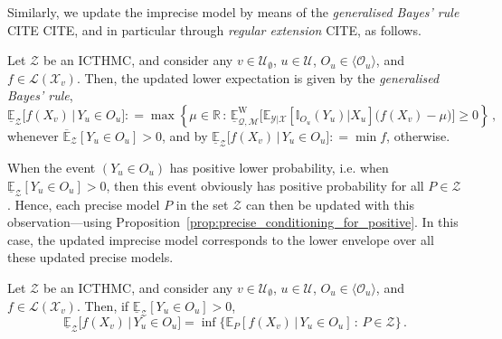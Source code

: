 \documentclass[twoside,11pt]{article}
\newcommand{\reals}{\mathbb{R}}
\newcommand{\states}{\mathcal{X}}
\newcommand{\observs}{\mathcal{Y}}
\newcommand{\lexp}{\underline{\mathbb{E}}_{\rateset,\mathcal{M}}^\mathrm{W}}
\newcommand{\gambles}{\mathcal{L}}
\newcommand{\ind}[1]{\mathbb{I}_{#1}}
\newcommand{\rateset}{\mathcal{Q}}
\newcommand{\coloneqq}{:\!=}
\begin{document}
Similarly, we update the imprecise model by means of the \emph{generalised Bayes' rule} CITE CITE, and in particular through \emph{regular extension} CITE, as follows.
\begin{definition}
Let $\mathcal{Z}$ be an ICTHMC, and consider any $v\in\mathcal{U}_\emptyset$, $u\in\mathcal{U}$, $O_u\in\langle\mathcal{O}_u\rangle$, and $f\in\gambles(\states_v)$. Then, the updated lower expectation is given by the \emph{generalised Bayes' rule},
\begin{equation*}
\underline{\mathbb{E}}_{\mathcal{Z}}\bigl[f(X_v)\,\vert\,Y_u\in O_u\bigr] \coloneqq \max\left\{\mu\in\reals\,:\, \lexp\bigl[\mathbb{E}_{\observs\vert\states}[\ind{O_u}(Y_u)\vert X_u]\bigl(f(X_v) - \mu\bigr)\bigr] \geq 0\right\}\,,
\end{equation*}
whenever $\overline{\mathbb{E}}_\mathcal{Z}[Y_u\in O_u] >0$, and by $\underline{\mathbb{E}}_{\mathcal{Z}}\bigl[f(X_v)\,\vert\,Y_u\in O_u\bigr]\coloneqq\min f$, otherwise.
\end{definition}

When the event $(Y_u\in O_u)$ has positive lower probability, i.e. when $\underline{\mathbb{E}}_\mathcal{Z}[Y_u\in O_u] > 0$, then this event obviously has positive probability for all $P\in\mathcal{Z}$. Hence, each precise model $P$ in the set $\mathcal{Z}$ can then be updated with this observation---using Proposition~\ref{prop:precise_conditioning_for_positive}. In this case, the updated imprecise model corresponds to the lower envelope over all these updated precise models.

\begin{proposition}\label{prop:GBR_positive_lower}
Let $\mathcal{Z}$ be an ICTHMC, and consider any $v\in\mathcal{U}_\emptyset$, $u\in\mathcal{U}$, $O_u\in\langle\mathcal{O}_u\rangle$, and $f\in\gambles(\states_v)$. Then, if $\underline{\mathbb{E}}_\mathcal{Z}[Y_u\in O_u] > 0$,
\begin{equation*}
\underline{\mathbb{E}}_{\mathcal{Z}}\bigl[f(X_v)\,\vert\,Y_u\in O_u\bigr] = \inf\bigl\{ \mathbb{E}_P[f(X_v)\,\vert\,Y_u\in O_u]\,:\, P\in\mathcal{Z} \bigr\}\,.
\end{equation*}
\end{proposition}
\end{document}
